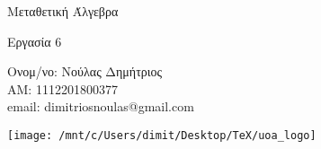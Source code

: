 \documentclass[oneside,a4paper]{article}
\newcommand {\tl}{\textlatin}
\begin{document}
	
	
	\begin{framed}	
		\begin{center}
			\huge Μεταθετική Άλγεβρα
		\end{center}
		\begin{center}
			\huge Εργασία 6
		\end{center}
		\vspace{0.3truecm}
		\begin{center}
			Ονομ/νο: Νούλας Δημήτριος\\
			ΑΜ: 1112201800377\\
			\tl{email}: \tl{dimitriosnoulas@gmail.com}
		\end{center}
		\vspace{0.3truecm}
	\end{framed}
	\vspace*{\fill}
	\begin{center}
	\texttt{[image: /mnt/c/Users/dimit/Desktop/TeX/uoa\_logo]}
	\end{center}
\vspace{1cm}
\pagebreak
\end{document}
